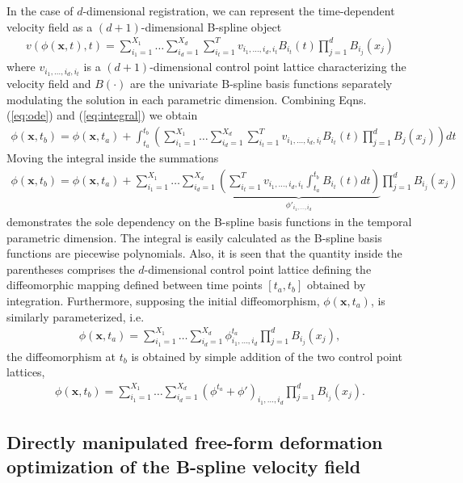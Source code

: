 \documentclass{llncs}
\begin{document}
In the case of 
$d$-dimensional registration, we can represent the time-dependent velocity field  
as a $(d + 1)$-dimensional B-spline object
\begin{align}
v(\phi(\mathbf{x},t), t) = \sum_{i_1=1}^{X_1}\ldots\sum_{i_d=1}^{X_d}\sum_{i_t=1}^T v_{i_1,\ldots,i_d,i_t} B_{i_t}(t) \prod_{j=1}^d B_{i_j}(x_j)
\end{align}
where $v_{i_1,\ldots,i_d,i_t}$ is a $(d+1)$-dimensional control point lattice
characterizing the velocity field and $B(\cdot)$ are the univariate B-spline
basis functions separately modulating the solution in each parametric dimension.
Combining Eqns. (\ref{eq:ode}) and (\ref{eq:integral}) we obtain
\begin{align}
\phi(\mathbf{x},t_b) = \phi(\mathbf{x},t_a) + \int_{t_a}^{t_b} \left( \sum_{i_1=1}^{X_1}\ldots\sum_{i_d=1}^{X_d}\sum_{i_t=1}^T 
    v_{i_1,\ldots,i_d,i_t} B_{i_t}(t)\prod_{j=1}^d B_{j}(x_j) \right) dt 
\end{align}
Moving the integral inside the summations
\begin{align}
\label{eq:velocityfield}
\phi(\mathbf{x},t_b) = \phi(\mathbf{x},t_a) + \sum_{i_1=1}^{X_1}\ldots\sum_{i_d=1}^{X_d} 
        \underbrace{\left( \sum_{i_t=1}^T v_{i_1,\ldots,i_d,i_t} \int_{t_a}^{t_b} B_{i_t}(t) dt \right)}_{\phi'_{i_1,\ldots,i_d}} \prod_{j=1}^d B_{i_j}(x_j) 
\end{align}
demonstrates the sole dependency on the B-spline basis functions in
the temporal parametric dimension.  The integral is easily calculated
as the B-spline basis functions are piecewise polynomials.
Also, it is seen that the 
quantity inside the parentheses comprises the $d$-dimensional 
control point lattice defining the diffeomorphic mapping
defined between time points $[t_a,t_b]$ obtained by 
integration.  Furthermore, supposing the initial diffeomorphism,
$\phi(\mathbf{x}, t_a)$, is similarly parameterized, i.e.
\begin{align}
  \phi(\mathbf{x}, t_a) = \sum_{i_1=1}^{X_1}\ldots\sum_{i_d=1}^{X_d} \phi^{t_a}_{i_1,\ldots,i_d}\prod_{j=1}^d B_{i_j}(x_j), 
\end{align}
the diffeomorphism at $t_b$ is obtained by simple addition of the two control point 
lattices,
\begin{align}
\phi(\mathbf{x},t_b) = \sum_{i_1=1}^{X_1}\ldots\sum_{i_d=1}^{X_d} \left(\phi^{t_a}+
\phi' \right)_{i_1,\ldots,i_d} \prod_{j=1}^d B_{i_j}(x_j).
\end{align}

\subsection{Directly manipulated free-form deformation optimization of the B-spline velocity field}
\end{document}
